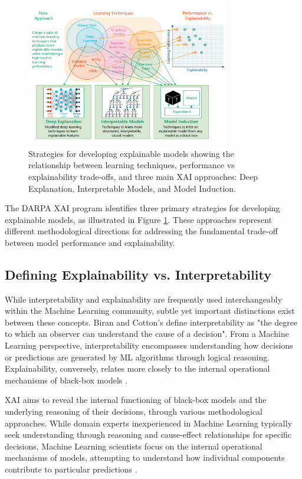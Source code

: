 \begin{figure}[ht]
\centering
\includegraphics[width=0.8\textwidth]{images/darpa_xai_strategies.png}
\caption{Strategies for developing explainable models showing the relationship between learning techniques, performance vs explainability trade-offs, and three main XAI approaches: Deep Explanation, Interpretable Models, and Model Induction.}
\label{fig:darpa_xai_strategies}
\end{figure}

The DARPA XAI program identifies three primary strategies for developing explainable models, as illustrated in Figure \ref{fig:darpa_xai_strategies}. These approaches represent different methodological directions for addressing the fundamental trade-off between model performance and explainability.

\subsection{Defining Explainability vs. Interpretability}

While interpretability and explainability are frequently used interchangeably within the Machine Learning community, subtle yet important distinctions exist between these concepts. Biran and Cotton's \cite{Biran2017ExplanationAJ} define interpretability as "the degree to which an observer can understand the cause of a decision". From a Machine Learning perspective, interpretability encompasses understanding how decisions or predictions are generated by ML algorithms through logical reasoning. Explainability, conversely, relates more closely to the internal operational mechanisms of black-box models \cite{alicioglu2021survey}.

XAI aims to reveal the internal functioning of black-box models and the underlying reasoning of their decisions, through various methodological approaches. While domain experts inexperienced in Machine Learning typically seek understanding through reasoning and cause-effect relationships for specific decisions, Machine Learning scientists focus on the internal operational mechanisms of models, attempting to understand how individual components contribute to particular predictions \cite{alicioglu2021survey}.

